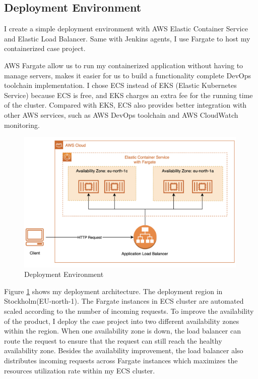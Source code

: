 \subsection{Deployment Environment}
I create a simple deployment environment with AWS Elastic Container Service and Elastic Load Balancer. Same with Jenkins agents, I use Fargate to host my containerized case project. 
\par
AWS Fargate allow us to run my containerized application without having to manage servers, makes it easier for us to build a functionality complete DevOps toolchain implementation. I chose ECS instead of EKS (Elastic Kubernetes Service) because ECS is free, and EKS charges an extra fee for the running time of the cluster. Compared with EKS, ECS also provides better integration with other AWS services, such as AWS DevOps toolchain and AWS CloudWatch monitoring.
\begin{figure}[h]
     \centering
     \includegraphics[width=0.99\textwidth]{pics/deploy.png}
     \caption{Deployment Environment}
     \label{fig:deploy}
\end{figure}
\par
Figure \ref{fig:deploy} shows my deployment architecture. The deployment region in Stockholm(EU-north-1). The Fargate instances in ECS cluster are automated scaled according to the number of incoming requests.
To improve the availability of the product, I deploy the case project into two different availability zones within the region.
When one availability zone is down, the load balancer can route the request to ensure that the request can still reach the healthy availability zone. Besides the availability improvement, the load balancer also distributes incoming requests across Fargate instances which maximizes the resources utilization rate within my ECS cluster.
